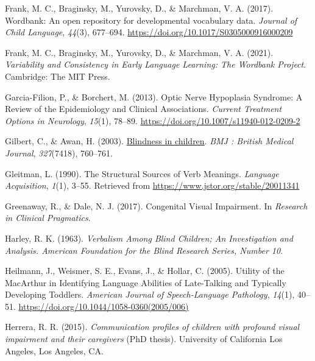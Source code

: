 \documentclass[
  man,floatsintext]{apa6}
\newlength{\cslhangindent}
\newlength{\cslentryspacingunit} %
\newenvironment{CSLReferences}[2] %
 {%
  \setlength{\parindent}{0pt}
  \ifodd #1
  \let\oldpar\par
  \def\par{\hangindent=\cslhangindent\oldpar}
  \fi
  \setlength{\parskip}{#2\cslentryspacingunit}
 }%
 {}
\begin{document}
\begin{CSLReferences}{1}{0}
\leavevmode{}%
Frank, M. C., Braginsky, M., Yurovsky, D., \& Marchman, V. A. (2017). Wordbank: An open repository for developmental vocabulary data. \emph{Journal of Child Language}, \emph{44}(3), 677--694. \url{https://doi.org/10.1017/S0305000916000209}

\leavevmode{}%
Frank, M. C., Braginsky, M., Yurovsky, D., \& Marchman, V. A. (2021). \emph{Variability and {Consistency} in {Early Language Learning}: {The Wordbank Project}}. {Cambridge}: {The MIT Press}.

\leavevmode{}%
Garcia-Filion, P., \& Borchert, M. (2013). Optic {Nerve Hypoplasia Syndrome}: {A Review} of the {Epidemiology} and {Clinical Associations}. \emph{Current Treatment Options in Neurology}, \emph{15}(1), 78--89. \url{https://doi.org/10.1007/s11940-012-0209-2}

\leavevmode{}%
Gilbert, C., \& Awan, H. (2003). \href{https://www.ncbi.nlm.nih.gov/pmc/articles/PMC214052}{Blindness in children}. \emph{BMJ : British Medical Journal}, \emph{327}(7418), 760--761.

\leavevmode{}%
Gleitman, L. (1990). The {Structural Sources} of {Verb Meanings}. \emph{Language Acquisition}, \emph{1}(1), 3--55. Retrieved from \url{https://www.jstor.org/stable/20011341}

\leavevmode{}%
Greenaway, R., \& Dale, N. J. (2017). Congenital {Visual Impairment}. In \emph{Research in {Clinical Pragmatics}}.

\leavevmode{}%
Harley, R. K. (1963). \emph{Verbalism {Among Blind Children}; {An Investigation} and {Analysis}. {American Foundation} for the {Blind Research Series}, {Number} 10}.

\leavevmode{}%
Heilmann, J., Weismer, S. E., Evans, J., \& Hollar, C. (2005). Utility of the {MacArthur} in {Identifying Language Abilities} of {Late-Talking} and {Typically Developing Toddlers}. \emph{American Journal of Speech-Language Pathology}, \emph{14}(1), 40--51. \url{https://doi.org/10.1044/1058-0360(2005/006)}

\leavevmode{}%
Herrera, R. R. (2015). \emph{Communication profiles of children with profound visual impairment and their caregivers} (PhD thesis). University of California Los Angeles, {Los Angeles, CA}.


\end{CSLReferences}
\end{document}
